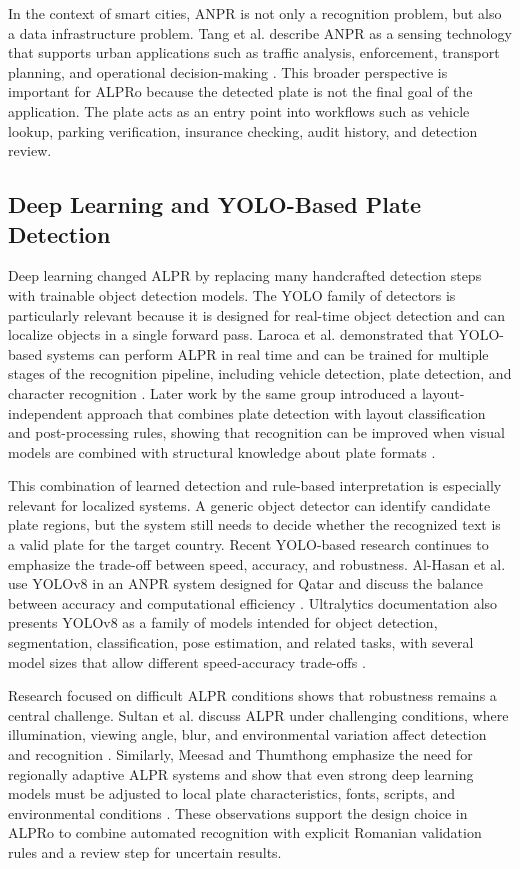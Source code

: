 ﻿\documentclass[12pt,a4paper]{article}
\begin{document}
In the context of smart cities, ANPR is not only a recognition problem, but also a data infrastructure problem. Tang et al. describe ANPR as a sensing technology that supports urban applications such as traffic analysis, enforcement, transport planning, and operational decision-making \cite{Tang2022}. This broader perspective is important for ALPRo because the detected plate is not the final goal of the application. The plate acts as an entry point into workflows such as vehicle lookup, parking verification, insurance checking, audit history, and detection review.

\subsection{Deep Learning and YOLO-Based Plate Detection}

Deep learning changed ALPR by replacing many handcrafted detection steps with trainable object detection models. The YOLO family of detectors is particularly relevant because it is designed for real-time object detection and can localize objects in a single forward pass. Laroca et al. demonstrated that YOLO-based systems can perform ALPR in real time and can be trained for multiple stages of the recognition pipeline, including vehicle detection, plate detection, and character recognition \cite{Laroca2018}. Later work by the same group introduced a layout-independent approach that combines plate detection with layout classification and post-processing rules, showing that recognition can be improved when visual models are combined with structural knowledge about plate formats \cite{Laroca2021}.

This combination of learned detection and rule-based interpretation is especially relevant for localized systems. A generic object detector can identify candidate plate regions, but the system still needs to decide whether the recognized text is a valid plate for the target country. Recent YOLO-based research continues to emphasize the trade-off between speed, accuracy, and robustness. Al-Hasan et al. use YOLOv8 in an ANPR system designed for Qatar and discuss the balance between accuracy and computational efficiency \cite{AlHasan2024}. Ultralytics documentation also presents YOLOv8 as a family of models intended for object detection, segmentation, classification, pose estimation, and related tasks, with several model sizes that allow different speed-accuracy trade-offs \cite{UltralyticsYOLOv8}.

Research focused on difficult ALPR conditions shows that robustness remains a central challenge. Sultan et al. discuss ALPR under challenging conditions, where illumination, viewing angle, blur, and environmental variation affect detection and recognition \cite{Sultan2023}. Similarly, Meesad and Thumthong emphasize the need for regionally adaptive ALPR systems and show that even strong deep learning models must be adjusted to local plate characteristics, fonts, scripts, and environmental conditions \cite{Meesad2025}. These observations support the design choice in ALPRo to combine automated recognition with explicit Romanian validation rules and a review step for uncertain results.
\end{document}
